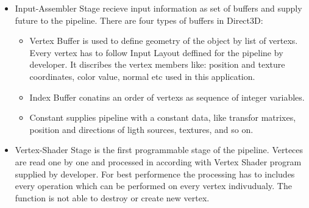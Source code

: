 \documentclass[twoside, english, 11pt]{report}
\begin{document}
\begin{itemize}
\item Input-Assembler Stage recieve input information as set of buffers and supply future to the pipeline. There are four types of buffers in Direct3D:
  \begin{itemize}
    \item Vertex Buffer is used to define geometry of the object by list of vertexs. Every vertex has to follow Input Layout deffined for the pipeline by developer. It discribes the vertex members like: position and texture coordinates, color value, normal etc used in this application.
    \item Index Buffer conatins an order of vertexs as sequence of integer variables.
    \item Constant supplies pipeline with a constant data, like transfor matrixes, position and directions of ligth sources, textures, and so on.
  \end{itemize}
\item Vertex-Shader Stage is the first programmable stage of the pipeline. Verteces are read one by one and processed in according with Vertex Shader program supplied by developer. For best performence the processing has to includes every operation which can be performed on every vertex indivudualy. The function is not able to destroy or create new vertex.


\end{itemize}
\end{document}
